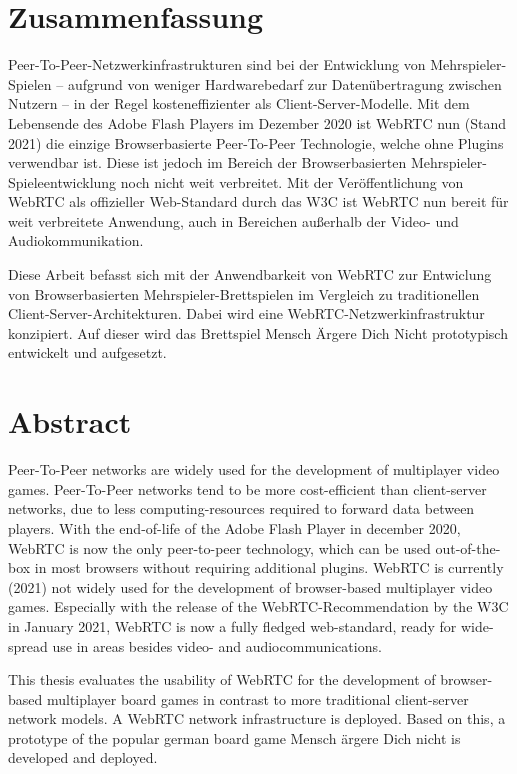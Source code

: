 \vspace{-55pt}
\begin{singlespace}
\chapter*{Zusammenfassung}

Peer-To-Peer-Netzwerkinfrastrukturen sind bei der Entwicklung von Mehrspieler-Spielen -- aufgrund von weniger Hardwarebedarf zur Datenübertragung zwischen Nutzern -- in der Regel kosteneffizienter als Client-Server-Modelle. Mit dem Lebensende des Adobe Flash Players im Dezember 2020 ist WebRTC nun (Stand 2021) die einzige Browserbasierte Peer-To-Peer Technologie, welche ohne Plugins verwendbar ist. Diese ist jedoch im Bereich der Browserbasierten Mehrspieler-Spieleentwicklung noch nicht weit verbreitet. Mit der Veröffentlichung von WebRTC als offizieller Web-Standard durch das W3C ist WebRTC nun bereit für weit verbreitete Anwendung, auch in Bereichen außerhalb der Video- und Audiokommunikation.\par

Diese Arbeit befasst sich mit der Anwendbarkeit von WebRTC zur Entwiclung von Browserbasierten Mehrspieler-Brettspielen  im Vergleich zu \glqq{}traditionellen\grqq{} Client-Server-Architekturen. Dabei wird eine WebRTC-Netzwerkinfrastruktur konzipiert. Auf dieser wird das Brettspiel \glqq{}Mensch Ärgere Dich Nicht\grqq{} prototypisch entwickelt und aufgesetzt.\par 

\let\clearpage\relax
\chapter*{Abstract}
Peer-To-Peer networks are widely used for the development of multiplayer video games. Peer-To-Peer networks tend to be more cost-efficient than client-server networks, due to less computing-resources required to forward data between players. With the end-of-life of the Adobe Flash Player in december 2020, WebRTC is now the only peer-to-peer technology, which can be used out-of-the-box in most browsers without requiring additional plugins. WebRTC is currently (2021) not widely used for the development of browser-based multiplayer video games. Especially with the release of the WebRTC-Recommendation by the W3C in January 2021, WebRTC is now a fully fledged web-standard, ready for wide-spread use in areas besides video- and audiocommunications.\par

This thesis evaluates the usability of WebRTC for the development of browser-based multiplayer board games in contrast to more \grqq{}traditional\grqq{} client-server network models. A WebRTC network infrastructure is deployed. Based on this, a prototype of the popular german board game \glqq{}Mensch ärgere Dich nicht\glqq{} is developed and deployed.\par
\end{singlespace}

